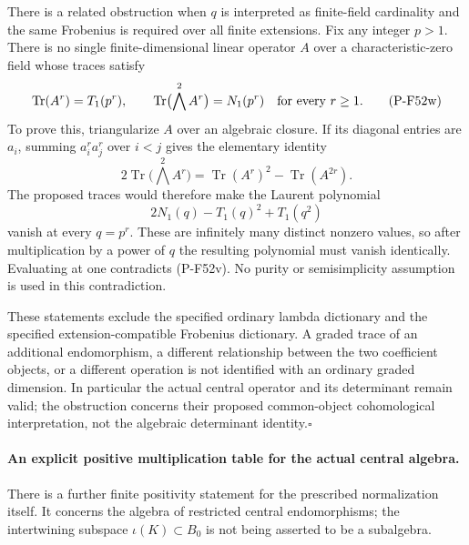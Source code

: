\documentclass[11pt,a4paper]{article}
\begin{document}
There is a related obstruction when $q$ is interpreted as
finite-field cardinality and the same Frobenius is required
over all finite extensions. Fix any integer $p>1$. There is
no single finite-dimensional linear operator $A$ over a
characteristic-zero field whose traces satisfy
\[
 \operatorname{Tr}(A^r)=T_1(p^r),\qquad
 \operatorname{Tr}\bigl(\bigwedge^2 A^r\bigr)=N_1(p^r)
                   \quad\hbox{for every }r\ge1.
                                                        \tag{P-F52w}
\]
To prove this, triangularize $A$ over an algebraic closure.
If its diagonal entries are $a_i$, summing
$a_i^r a_j^r$ over $i<j$ gives the elementary identity
\[
 2\operatorname{Tr}\bigl(\bigwedge^2 A^r\bigr)
       =\operatorname{Tr}(A^r)^2-\operatorname{Tr}(A^{2r}).
\]
The proposed traces would therefore make the Laurent
polynomial
\[
       2N_1(q)-T_1(q)^2+T_1(q^2)
                                                        \tag{P-F52x}
\]
vanish at every $q=p^r$. These are infinitely many distinct
nonzero values, so after multiplication by a power of $q$
the resulting polynomial must vanish identically. Evaluating
at one contradicts (P-F52v). No purity or semisimplicity
assumption is used in this contradiction.

These statements exclude the specified ordinary lambda
dictionary and the specified extension-compatible Frobenius
dictionary. A graded trace of an additional endomorphism,
a different relationship between the two coefficient objects,
or a different operation is not identified with an ordinary
graded dimension. In particular the actual central operator
and its determinant remain valid; the obstruction concerns
their proposed common-object cohomological interpretation,
not the algebraic determinant identity.\hfill$\square$

\paragraph{An explicit positive multiplication table for the actual central algebra.}
There is a further finite positivity statement for the prescribed
normalization itself. It concerns the algebra of restricted central
endomorphisms; the intertwining subspace $\iota(K)\subset B_0$ is
not being asserted to be a subalgebra.
\end{document}
